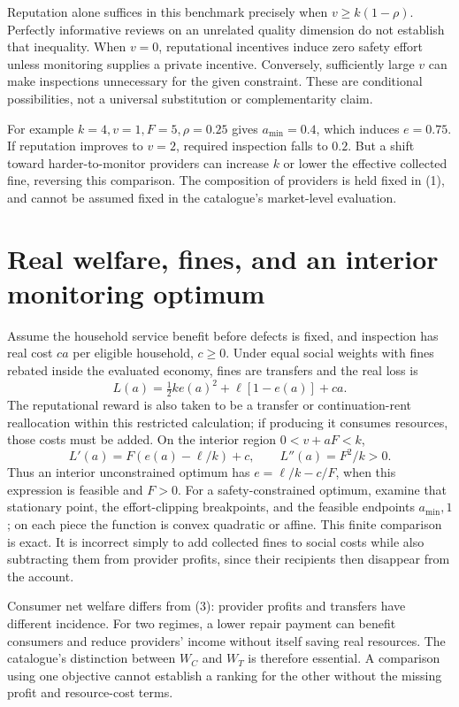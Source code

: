 \documentclass[11pt,a4paper]{article}
\begin{document}
Reputation alone suffices in this benchmark precisely when $v\ge k(1-\rho)$. Perfectly informative reviews on an unrelated quality dimension do not establish that inequality. When $v=0$, reputational incentives induce zero safety effort unless monitoring supplies a private incentive. Conversely, sufficiently large $v$ can make inspections unnecessary for the given constraint. These are conditional possibilities, not a universal substitution or complementarity claim.

For example $k=4,v=1,F=5,\rho=0.25$ gives $a_{\min}=0.4$, which induces $e=0.75$. If reputation improves to $v=2$, required inspection falls to $0.2$. But a shift toward harder-to-monitor providers can increase $k$ or lower the effective collected fine, reversing this comparison. The composition of providers is held fixed in (1), and cannot be assumed fixed in the catalogue's market-level evaluation.

\section{Real welfare, fines, and an interior monitoring optimum}
Assume the household service benefit before defects is fixed, and inspection has real cost $ca$ per eligible household, $c\ge0$. Under equal social weights with fines rebated inside the evaluated economy, fines are transfers and the real loss is
\[
 L(a)=\tfrac12k e(a)^2+\ell[1-e(a)]+ca. \tag{3}
\]
The reputational reward is also taken to be a transfer or continuation-rent reallocation within this restricted calculation; if producing it consumes resources, those costs must be added. On the interior region $0<v+aF<k$,
\[
 L'(a)=F(e(a)-\ell/k)+c,\qquad L''(a)=F^2/k>0. \tag{4}
\]
Thus an interior unconstrained optimum has $e=\ell/k-c/F$, when this expression is feasible and $F>0$. For a safety-constrained optimum, examine that stationary point, the effort-clipping breakpoints, and the feasible endpoints $a_{\min},1$; on each piece the function is convex quadratic or affine. This finite comparison is exact. It is incorrect simply to add collected fines to social costs while also subtracting them from provider profits, since their recipients then disappear from the account.

Consumer net welfare differs from (3): provider profits and transfers have different incidence. For two regimes, a lower repair payment can benefit consumers and reduce providers' income without itself saving real resources. The catalogue's distinction between $W_C$ and $W_T$ is therefore essential. A comparison using one objective cannot establish a ranking for the other without the missing profit and resource-cost terms.
\end{document}
